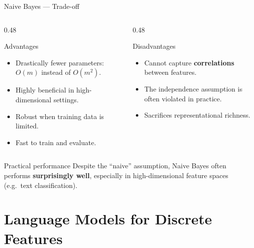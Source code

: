 \begin{frame}{Naive Bayes — Trade-off}
  \begin{columns}[T]
    \begin{column}{0.48\textwidth}
      \begin{block}{Advantages}
        \begin{itemize}
          \item Drastically fewer parameters: $O(m)$ instead of $O(m^2)$.
          \item Highly beneficial in high-dimensional settings.
          \item Robust when training data is limited.
          \item Fast to train and evaluate.
        \end{itemize}
      \end{block}
    \end{column}
    \begin{column}{0.48\textwidth}
      \begin{alertblock}{Disadvantages}
        \begin{itemize}
          \item Cannot capture \textbf{correlations} between features.
          \item The independence assumption is often violated in practice.
          \item Sacrifices representational richness.
        \end{itemize}
      \end{alertblock}
    \end{column}
  \end{columns}

  \vspace{4mm}
  \begin{exampleblock}{Practical performance}
    Despite the ``naive'' assumption, Naive Bayes often performs \textbf{surprisingly well},
    especially in high-dimensional feature spaces (e.g.\ text classification).
  \end{exampleblock}
\end{frame}

\section{Language Models for Discrete Features}

